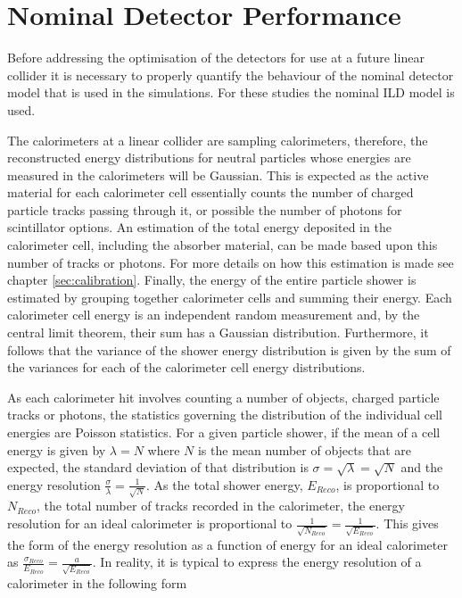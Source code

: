 \section{Nominal Detector Performance}
\label{sec:nominaldetectorperformance}
Before addressing the optimisation of the detectors for use at a future linear collider it is necessary to properly quantify the behaviour of the nominal detector model that is used in the simulations.  For these studies the nominal ILD model is used.  

The calorimeters at a linear collider are sampling calorimeters, therefore, the reconstructed energy distributions for neutral particles whose energies are measured in the calorimeters will be Gaussian.  This is expected as the active material for each calorimeter cell essentially counts the number of charged particle tracks passing through it, or possible the number of photons for scintillator options.  An estimation of the total energy deposited in the calorimeter cell, including the absorber material, can be made based upon this number of tracks or photons.  For more details on how this estimation is made see chapter \ref{sec:calibration}.  Finally, the energy of the entire particle shower is estimated by grouping together calorimeter cells and summing their energy.  Each calorimeter cell energy is an independent random measurement and, by the central limit theorem, their sum has a Gaussian distribution.  Furthermore, it follows that the variance of the shower energy distribution is given by the sum of the variances for each of the calorimeter cell energy distributions.  

As each calorimeter hit involves counting a number of objects, charged particle tracks or photons, the statistics governing the distribution of the individual cell energies are Poisson statistics.  For a given particle shower, if the mean of a cell energy is given by $\lambda = N$ where $N$ is the mean number of objects that are expected, the standard deviation of that distribution is $\sigma = \sqrt{\lambda} = \sqrt{N}$ and the energy resolution $\frac{\sigma}{\lambda} = \frac{1}{\sqrt{N}}$.  As the total shower energy, $E_{Reco}$, is proportional to $N_{Reco}$, the total number of tracks recorded in the calorimeter, the energy resolution for an ideal calorimeter is proportional to $\frac{1}{\sqrt{N_{Reco}}} = \frac{1}{\sqrt{E_{Reco}}}$.  This gives the form of the energy resolution as a function of energy for an ideal calorimeter as $\frac{\sigma_{Reco}}{E_{Reco}} = \frac{a}{\sqrt{E_{Reco}}}$.  In reality, it is typical to express the energy resolution of a calorimeter in the following form

